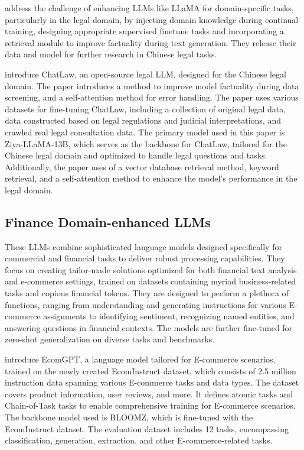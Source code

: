 \citet{huang2023lawyer} address the challenge of enhancing LLMs like LLaMA for domain-specific tasks, particularly in the legal domain, by injecting domain knowledge during continual training, designing appropriate supervised finetune tasks and incorporating a retrieval module to improve factuality during text generation. They release their data and model for further research in Chinese legal tasks.


\citet{cui2023chatlaw} introduce ChatLaw, an open-source legal LLM, designed for the Chinese legal domain. The paper introduces a method to improve model factuality during data screening, and a self-attention method for error handling.
The paper uses various datasets for fine-tuning ChatLaw, including a collection of original legal data, data constructed based on legal regulations and judicial interpretations, and crawled real legal consultation data.
The primary model used in this paper is Ziya-LLaMA-13B, which serves as the backbone for ChatLaw, tailored for the Chinese legal domain and optimized to handle legal questions and tasks. Additionally, the paper uses of a vector database retrieval method, keyword retrieval, and a self-attention method to enhance the model's performance in the legal domain.



\subsection{Finance Domain-enhanced LLMs} These LLMs combine sophisticated language models designed specifically for commercial and financial tasks to deliver robust processing capabilities. They focus on creating tailor-made solutions optimized for both financial text analysis and e-commerce settings, trained on datasets containing myriad business-related tasks and copious financial tokens. They are designed to perform a plethora of functions, ranging from understanding and generating instructions for various E-commerce assignments to identifying sentiment, recognizing named entities, and answering questions in financial contexts. The models are further fine-tuned for zero-shot generalization on diverse tasks and benchmarks. 

\citet{li2023ecomgpt} introduce EcomGPT, a language model tailored for E-commerce scenarios, trained on the newly created EcomInstruct dataset, which consists of 2.5 million instruction data spanning various E-commerce tasks and data types.
The dataset covers product information, user reviews, and more. It defines atomic tasks and Chain-of-Task tasks to enable comprehensive training for E-commerce scenarios.
The backbone model used is BLOOMZ, which is fine-tuned with the EcomInstruct dataset. The evaluation dataset includes 12 tasks, encompassing classification, generation, extraction, and other E-commerce-related tasks.


